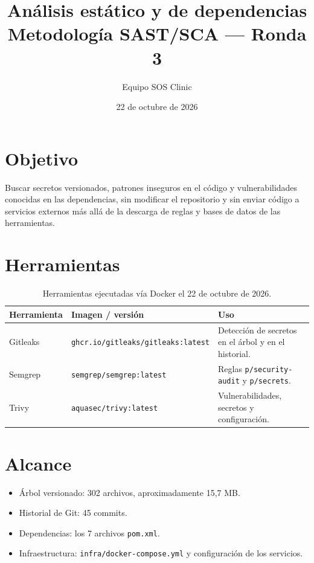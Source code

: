 \documentclass[11pt]{article}
\title{\textbf{Análisis estático y de dependencias}\\[0.3em]
\large Metodología SAST/SCA --- Ronda 3}
\author{Equipo SOS Clinic}
\date{22 de octubre de 2026}
\begin{document}
\maketitle

\section{Objetivo}

Buscar secretos versionados, patrones inseguros en el código y vulnerabilidades
conocidas en las dependencias, sin modificar el repositorio y sin enviar código
a servicios externos más allá de la descarga de reglas y bases de datos de las
herramientas.

\section{Herramientas}

\begin{table}[h]
\centering
\small
\begin{tabular}{@{}p{2.6cm}p{4.2cm}p{7.2cm}@{}}
\toprule
Herramienta & Imagen / versión & Uso \\
\midrule
Gitleaks & \texttt{ghcr.io/gitleaks/gitleaks:latest} & Detección de secretos en el árbol y en el historial. \\
Semgrep & \texttt{semgrep/semgrep:latest} & Reglas \texttt{p/security-audit} y \texttt{p/secrets}. \\
Trivy & \texttt{aquasec/trivy:latest} & Vulnerabilidades, secretos y configuración. \\
\bottomrule
\end{tabular}
\caption{Herramientas ejecutadas vía Docker el 22 de octubre de 2026.}
\end{table}

\section{Alcance}

\begin{itemize}
  \item Árbol versionado: 302 archivos, aproximadamente 15,7 MB.
  \item Historial de Git: 45 commits.
  \item Dependencias: los 7 archivos \texttt{pom.xml}.
  \item Infraestructura: \texttt{infra/docker-compose.yml} y configuración de
  los servicios.
\end{itemize}
\end{document}
